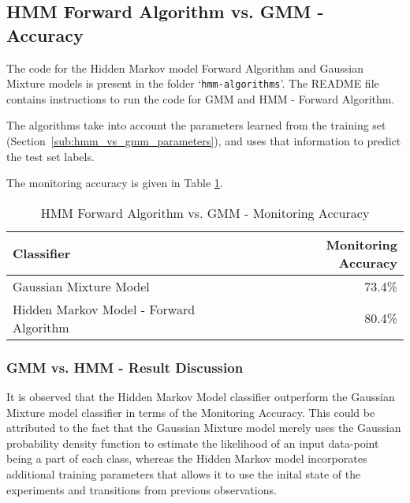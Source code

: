 \documentclass[parskip=half]{scrartcl}
\begin{document}


    \subsection{HMM Forward Algorithm vs. GMM - Accuracy} %
    \label{sub:hmm_forward_algorithm_vs_gmm_accuracy}

        The code for the Hidden Markov model Forward Algorithm and Gaussian Mixture models is present in the folder `\texttt{hmm-algorithms}'. The README file contains instructions to run the code for GMM and HMM - Forward Algorithm.

        The algorithms take into account the parameters learned from the training set (Section~\ref{sub:hmm_vs_gmm_parameters}), and uses that information to predict the test set labels.

        The monitoring accuracy is given in Table \ref{tab:hmm-forward-algorithm-vs-gmm-monitoring-accuracy}.

        \begin{table}[ht]
            \centering
            \begin{tabular}{| l | r |}
            \hline
            \textbf{Classifier} & \textbf{Monitoring Accuracy} \\
            \hline
            \hline
                Gaussian Mixture Model & 73.4\% \\
            \hline
                Hidden Markov Model - Forward Algorithm & 80.4\% \\
            \hline
            \end{tabular}
            \caption{HMM Forward Algorithm vs. GMM - Monitoring Accuracy}
            \label{tab:hmm-forward-algorithm-vs-gmm-monitoring-accuracy}
        \end{table}

        \subsubsection*{GMM vs. HMM - Result Discussion} %
        \label{ssub:gmm_vs_hmm_result_discussion}

            It is observed that the Hidden Markov Model classifier outperform the Gaussian Mixture model classifier in terms of the Monitoring Accuracy. This could be attributed to the fact that the Gaussian Mixture model merely uses the Gaussian probability density function to estimate the likelihood of an input data-point being a part of each class, whereas the Hidden Markov model incorporates additional training parameters that allows it to use the inital state of the experiments and transitions from previous observations. 
\end{document}
